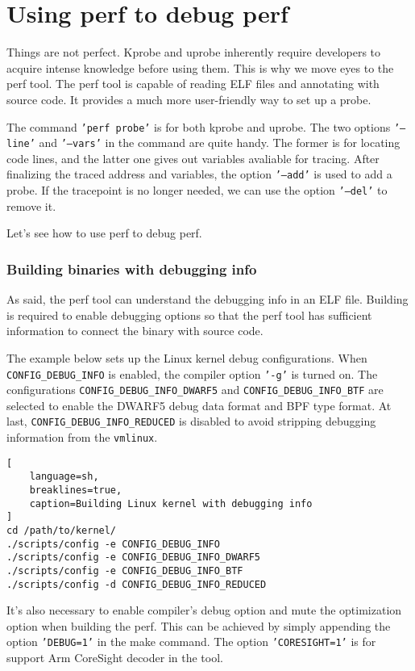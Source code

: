 \documentclass[11pt]{diazessay} %
\def\code#1{\texttt{#1}}
\begin{document}
\section*{Using perf to debug perf}

Things are not perfect. Kprobe and uprobe inherently require developers to
acquire intense knowledge before using them. This is why we move eyes to the
perf tool. The perf tool is capable of reading ELF files and annotating with
source code. It provides a much more user-friendly way to set up a probe.

The command \code{'perf probe'} is for both kprobe and uprobe. The two
options \code{'---line'} and \code{'---vars'} in the command are quite handy.
The former is for locating code lines, and the latter one gives out variables
avaliable for tracing. After finalizing the traced address and variables, the
option \code{'---add'} is used to add a probe. If the tracepoint is no longer
needed, we can use the option \code{'---del'} to remove it.

Let's see how to use perf to debug perf.

\subsubsection*{Building binaries with debugging info}

As said, the perf tool can understand the debugging info in an ELF file.
Building is required to enable debugging options so that the perf tool has
sufficient information to connect the binary with source code.

The example below sets up the Linux kernel debug configurations. When
\code{CONFIG\_DEBUG\_INFO} is enabled, the compiler option \code{'-g'} is
turned on. The configurations \code{CONFIG\_DEBUG\_INFO\_DWARF5} and
\code{CONFIG\_DEBUG\_INFO\_BTF} are selected to enable the DWARF5 debug data
format and BPF type format. At last, \code{CONFIG\_DEBUG\_INFO\_REDUCED} is
disabled to avoid stripping debugging information from the \code{vmlinux}.

\begin{lstlisting}[
  	language=sh,
	breaklines=true,
	caption=Building Linux kernel with debugging info
]
cd /path/to/kernel/
./scripts/config -e CONFIG_DEBUG_INFO
./scripts/config -e CONFIG_DEBUG_INFO_DWARF5
./scripts/config -e CONFIG_DEBUG_INFO_BTF
./scripts/config -d CONFIG_DEBUG_INFO_REDUCED
\end{lstlisting}

It's also necessary to enable compiler's debug option and mute the optimization
option when building the perf. This can be achieved by simply appending the
option \code{'DEBUG=1'} in the make command. The option \code{'CORESIGHT=1'} is
for support Arm CoreSight decoder in the tool.
\end{document}
